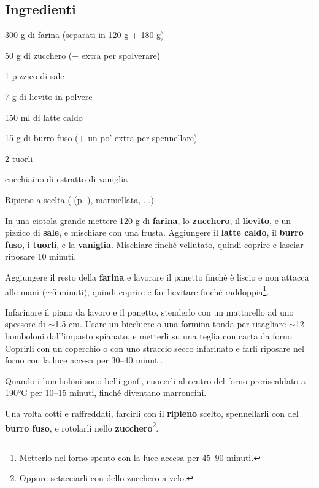 \newpage
{}

\subsection*{Ingredienti}
\begin{ingredients}
	\item 300 g di farina (separati in 120 g + 180 g)
	\item 50 g di zucchero ($+$ extra per spolverare)
	\item 1 pizzico di sale
	\item 7 g di lievito in polvere
	\item 150 ml di latte caldo
	\item 15 g di burro fuso ($+$ un po' extra per spennellare)
	\item 2 tuorli
	\item {} cucchiaino di estratto di vaniglia
	\item Ripieno a scelta (\textit{} (p. \pageref{crema_pasticcera}), marmellata, ...)
\end{ingredients}

\medskip

In una ciotola grande mettere 120 g di \textbf{farina}, lo \textbf{zucchero}, il \textbf{lievito}, e un pizzico di \textbf{sale}, e mischiare con una frusta. 
Aggiungere il \textbf{latte caldo}, il \textbf{burro fuso}, i \textbf{tuorli}, e la \textbf{vaniglia}. 
Mischiare finché vellutato, quindi coprire e lasciar riposare 10 minuti. 

Aggiungere il resto della \textbf{farina} e lavorare il panetto finché è liscio e non attacca alle mani ($\sim$5 minuti), quindi coprire e far lievitare finché raddoppia\footnote{Metterlo nel forno spento con la luce accesa per 45--90 minuti.}.

Infarinare il piano da lavoro e il panetto, stenderlo con un mattarello ad uno spessore di $\sim$1.5 cm. 
Usare un bicchiere o una formina tonda per ritagliare $\sim$12 bomboloni dall'impasto spianato, e metterli su una teglia con carta da forno.
Coprirli con un coperchio o con uno straccio secco infarinato e farli riposare nel forno con la luce accesa per 30--40 minuti. 

Quando i bomboloni sono belli gonfi, cuocerli al centro del forno preriscaldato a 190°C per 10--15 minuti, finché diventano marroncini. 

Una volta cotti e raffreddati, farcirli con il \textbf{ripieno} scelto, spennellarli con del \textbf{burro fuso}, e rotolarli nello \textbf{zucchero}\footnote{Oppure setacciarli con dello zucchero a velo.}. 




\vspace*{0.75 cm}

\begin{recipeblock}
	\noindent 
\end{recipeblock}